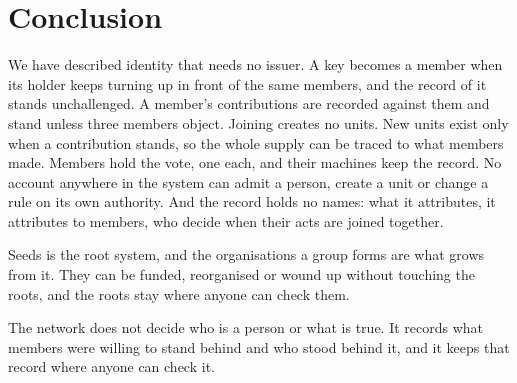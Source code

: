 \documentclass[11pt,a4paper]{article}
\begin{document}
\section{Conclusion}
\label{sec:conclusion}

We have described identity that needs no issuer. A key becomes a member when its holder keeps turning up in front of the same members, and the record of it stands unchallenged. A member's contributions are recorded against them and stand unless three members object. Joining creates no units. New units exist only when a contribution stands, so the whole supply can be traced to what members made. Members hold the vote, one each, and their machines keep the record. No account anywhere in the system can admit a person, create a unit or change a rule on its own authority. And the record holds no names: what it attributes, it attributes to members, who decide when their acts are joined together.

Seeds is the root system, and the organisations a group forms are what grows from it. They can be funded, reorganised or wound up without touching the roots, and the roots stay where anyone can check them.

The network does not decide who is a person or what is true. It records what members were willing to stand behind and who stood behind it, and it keeps that record where anyone can check it.


{\small}
\end{document}

